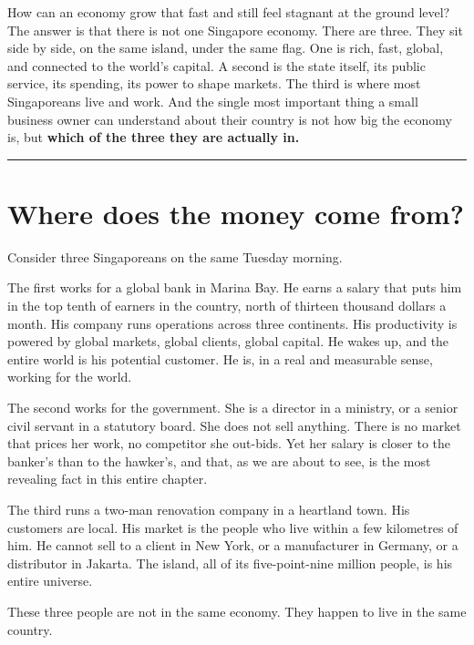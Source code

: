 \documentclass[10pt,twoside,openany]{memoir}
\begin{document}
{{How can an economy grow that fast and still feel stagnant at the ground
level? The answer is that there is not one Singapore economy. There are
three. They sit side by side, on the same island, under the same flag.
One is rich, fast, global, and connected to the world's
capital.\cite{worldbank-trade} A second is the state itself, its public
service, its spending, its power to shape markets. The third is where
most Singaporeans live and work. And the single most important thing a
small business owner can understand about their country is not how big
the economy is, but \textbf{which of the three they are actually in.}

\begin{center}\rule{0.5\linewidth}{0.5pt}\end{center}

\FloatBarrier
\chapter{Where does the money come
from?}\label{where-does-the-money-come-from}

Consider three Singaporeans on the same Tuesday morning.

The first works for a global bank in Marina Bay. He earns a salary that
puts him in the top tenth of earners in the country, north of thirteen
thousand dollars a month. His company runs operations across three
continents. His productivity is powered by global markets, global
clients, global capital. He wakes up, and the entire world is his
potential customer. He is, in a real and measurable sense, working for
the world.

The second works for the government. She is a director in a ministry, or
a senior civil servant in a statutory board. She does not sell anything.
There is no market that prices her work, no competitor she out-bids. Yet
her salary is closer to the banker's than to the hawker's, and that, as
we are about to see, is the most revealing fact in this entire chapter.

The third runs a two-man renovation company in a heartland town. His
customers are local. His market is the people who live within a few
kilometres of him. He cannot sell to a client in New York, or a
manufacturer in Germany, or a distributor in Jakarta. The island, all of
its five-point-nine million people, is his entire universe.

These three people are not in the same economy. They happen to live in
the same country.

}}
\end{document}

